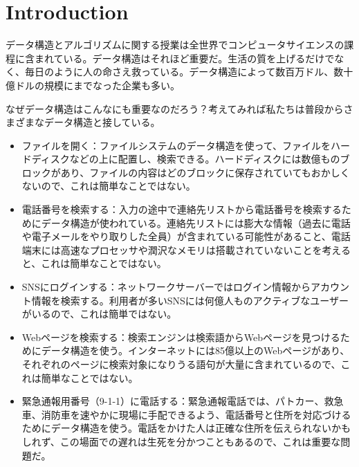 \chapter{Introduction}

データ構造とアルゴリズムに関する授業は全世界でコンピュータサイエンスの課程に含まれている。データ構造はそれほど重要だ。生活の質を上げるだけでなく、毎日のように人の命さえ救っている。データ構造によって数百万ドル、数十億ドルの規模にまでなった企業も多い。

なぜデータ構造はこんなにも重要なのだろう？考えてみれば私たちは普段からさまざまなデータ構造と接している。

\begin{itemize}
	\item ファイルを開く：ファイルシステムのデータ構造を使って、ファイルをハードディスクなどの上に配置し、検索できる。ハードディスクには数億ものブロックがあり、ファイルの内容はどのブロックに保存されていてもおかしくないので、これは簡単なことではない。
	\item 電話番号を検索する：入力の途中で連絡先リストから電話番号を検索するためにデータ構造が使われている。連絡先リストには膨大な情報（過去に電話や電子メールをやり取りした全員）が含まれている可能性があること、電話端末には高速なプロセッサや潤沢なメモリは搭載されていないことを考えると、これは簡単なことではない。
	\item SNSにログインする：ネットワークサーバーではログイン情報からアカウント情報を検索する。利用者が多いSNSには何億人ものアクティブなユーザーがいるので、これは簡単ではない。
	\item Webページを検索する：検索エンジンは検索語からWebページを見つけるためにデータ構造を使う。インターネットには85億以上のWebページがあり、それぞれのページに検索対象になりうる語句が大量に含まれているので、これは簡単なことではない。
	\item 緊急通報用番号（9-1-1）に電話する：緊急通報電話では、パトカー、救急車、消防車を速やかに現場に手配できるよう、電話番号と住所を対応づけるためにデータ構造を使う。電話をかけた人は正確な住所を伝えられないかもしれず、この場面での遅れは生死を分かつこともあるので、これは重要な問題だ。
\end{itemize}

